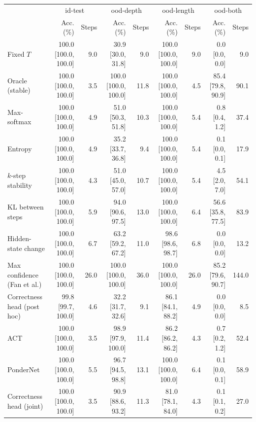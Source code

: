 \begin{tabular}{lrrrrrrrr}
\toprule
 & \multicolumn{2}{c}{id-test} & \multicolumn{2}{c}{ood-depth} & \multicolumn{2}{c}{ood-length} & \multicolumn{2}{c}{ood-both} \\
 & Acc. (\%) & Steps & Acc. (\%) & Steps & Acc. (\%) & Steps & Acc. (\%) & Steps \\
\midrule
Fixed $T$ & 100.0 \tiny{[100.0, 100.0]} & 9.0 & 30.9 \tiny{[30.0, 31.8]} & 9.0 & 100.0 \tiny{[100.0, 100.0]} & 9.0 & 0.0 \tiny{[0.0, 0.0]} & 9.0 \\
Oracle (stable) & 100.0 \tiny{[100.0, 100.0]} & 3.5 & 100.0 \tiny{[100.0, 100.0]} & 11.8 & 100.0 \tiny{[100.0, 100.0]} & 4.5 & 85.4 \tiny{[79.8, 90.9]} & 90.1 \\
\midrule
Max-softmax & 100.0 \tiny{[100.0, 100.0]} & 4.9 & 51.0 \tiny{[50.3, 51.8]} & 10.3 & 100.0 \tiny{[100.0, 100.0]} & 5.4 & 0.8 \tiny{[0.4, 1.2]} & 37.4 \\
Entropy & 100.0 \tiny{[100.0, 100.0]} & 4.9 & 35.2 \tiny{[33.7, 36.8]} & 9.4 & 100.0 \tiny{[100.0, 100.0]} & 5.4 & 0.1 \tiny{[0.0, 0.1]} & 17.9 \\
$k$-step stability & 100.0 \tiny{[100.0, 100.0]} & 4.3 & 51.0 \tiny{[45.0, 57.0]} & 10.7 & 100.0 \tiny{[100.0, 100.0]} & 5.4 & 4.5 \tiny{[2.0, 7.0]} & 54.1 \\
KL between steps & 100.0 \tiny{[100.0, 100.0]} & 5.9 & 94.0 \tiny{[90.6, 97.5]} & 13.0 & 100.0 \tiny{[100.0, 100.0]} & 6.4 & 56.6 \tiny{[35.8, 77.5]} & 83.9 \\
Hidden-state change & 100.0 \tiny{[100.0, 100.0]} & 6.7 & 63.2 \tiny{[59.2, 67.2]} & 11.0 & 98.6 \tiny{[98.6, 98.7]} & 6.8 & 0.0 \tiny{[0.0, 0.0]} & 13.2 \\
Max confidence (Fan et al.) & 100.0 \tiny{[100.0, 100.0]} & 26.0 & 100.0 \tiny{[100.0, 100.0]} & 36.0 & 100.0 \tiny{[100.0, 100.0]} & 26.0 & 85.2 \tiny{[79.6, 90.7]} & 144.0 \\
Correctness head (post hoc) & 99.8 \tiny{[99.7, 100.0]} & 4.6 & 32.2 \tiny{[31.7, 32.6]} & 9.1 & 86.1 \tiny{[84.1, 88.2]} & 4.9 & 0.0 \tiny{[0.0, 0.0]} & 8.5 \\
\midrule
ACT & 100.0 \tiny{[100.0, 100.0]} & 3.5 & 98.9 \tiny{[97.9, 100.0]} & 11.4 & 86.2 \tiny{[86.2, 86.2]} & 4.3 & 0.7 \tiny{[0.2, 1.2]} & 52.4 \\
PonderNet & 100.0 \tiny{[100.0, 100.0]} & 5.5 & 96.7 \tiny{[94.5, 98.8]} & 13.1 & 100.0 \tiny{[100.0, 100.0]} & 6.4 & 0.1 \tiny{[0.0, 0.1]} & 58.9 \\
Correctness head (joint) & 100.0 \tiny{[100.0, 100.0]} & 3.5 & 90.9 \tiny{[88.6, 93.2]} & 11.3 & 81.0 \tiny{[78.1, 84.0]} & 4.3 & 0.1 \tiny{[0.1, 0.2]} & 27.0 \\

\end{tabular}
